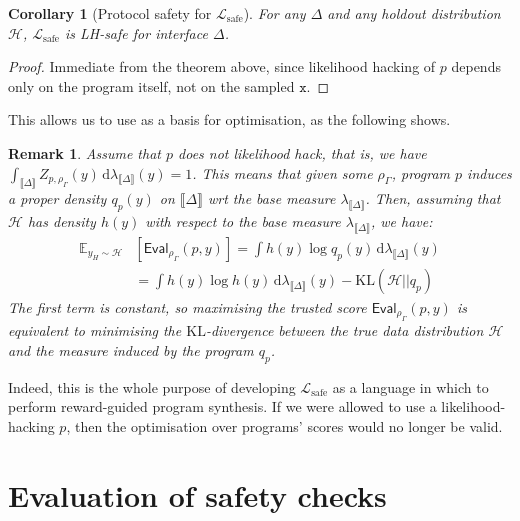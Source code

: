 \documentclass[preprint]{uai2026} %
\newtheorem{corollary}{Corollary}
\newtheorem{remark}{Remark}
\newcommand{\sem}[1]{\llbracket #1 \rrbracket}
\newcommand{\Lsafe}{\mathcal{L}_{\text{safe}}}
\newcommand{\KL}{\mathrm{KL}}
\newcommand{\datavar}[1]{\mathtt{#1}}
\newcommand{\TEval}{\mathsf{Eval}}
\newcommand{\dd}{\,\mathrm{d}}
\begin{document}
\begin{corollary}[Protocol safety for $\Lsafe$]
For any $\Delta$ and any holdout distribution $\mathcal{H}$, $\Lsafe$ is LH-safe for interface $\Delta$.
\end{corollary}
\begin{proof}
    Immediate from the theorem above, since likelihood hacking of $p$ depends only on the program itself, not on the sampled $\datavar{x}$.
\end{proof}
This allows us to use  as a basis for optimisation, as the following shows.
\begin{remark}\label{remark:training-kl}
    Assume that $p$ does not likelihood hack, that is, we have $\int_{\sem{\Delta}}Z_{p, \rho_\Gamma}(y)\dd\lambda_{\sem{\Delta}}(y) = 1$. This means that given some $\rho_\Gamma$, program $p$ induces a proper density $q_p(y)$ on $\sem{\Delta}$ wrt the base measure $\lambda_{\sem{\Delta}}$. Then, assuming that $\mathcal H$ has density $h(y)$ with respect to the base measure $\lambda_{\sem{\Delta}}$, we have:
    \begin{align*}
    \mathbb{E}_{y_H \sim \mathcal H}&[\TEval_{\rho_{\Gamma}}(p, y)] = \int h(y)\log q_p(y) \dd\lambda_{\sem{\Delta}}(y) \\
    &= \int h(y)\log h(y) \dd\lambda_{\sem{\Delta}}(y) - \KL(\mathcal H||q_p)    
    \end{align*}
    The first term is constant, so maximising the trusted score $\TEval_{\rho_\Gamma}(p, y)$ is equivalent to minimising the $\KL$-divergence between the true data distribution $\mathcal H$ and the measure induced by the program $q_p$.
\end{remark}
Indeed, this is the whole purpose of developing $\Lsafe$ as a language in which to perform reward-guided program synthesis. If we were allowed to use a likelihood-hacking $p$, then the optimisation over programs' scores would no longer be valid.


\section{Evaluation of safety checks}\label{sec:implementation}

\end{document}
